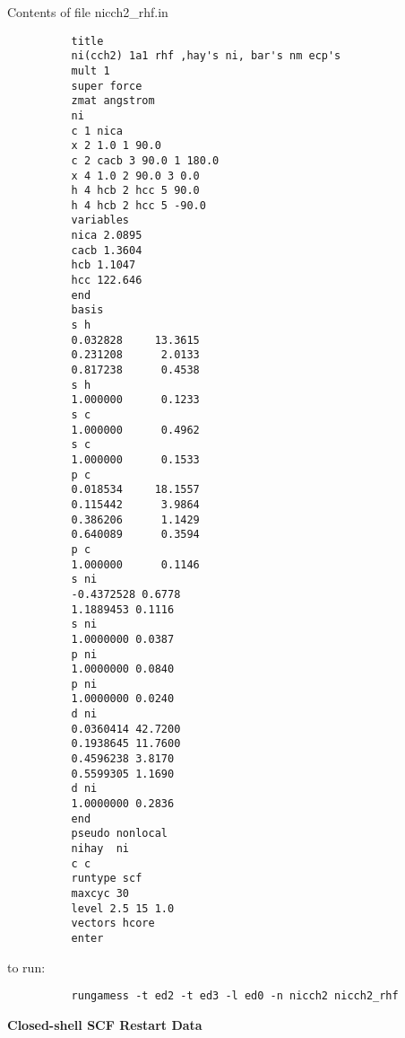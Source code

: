 \documentclass[11pt,fleqn]{article}
\begin{document}
Contents of file nicch2\_rhf.in
{
\footnotesize
\begin{verbatim}
          title
          ni(cch2) 1a1 rhf ,hay's ni, bar's nm ecp's
          mult 1
          super force
          zmat angstrom
          ni
          c 1 nica
          x 2 1.0 1 90.0
          c 2 cacb 3 90.0 1 180.0
          x 4 1.0 2 90.0 3 0.0
          h 4 hcb 2 hcc 5 90.0
          h 4 hcb 2 hcc 5 -90.0
          variables
          nica 2.0895
          cacb 1.3604
          hcb 1.1047
          hcc 122.646
          end
          basis
          s h
          0.032828     13.3615
          0.231208      2.0133
          0.817238      0.4538
          s h
          1.000000      0.1233
          s c
          1.000000      0.4962
          s c
          1.000000      0.1533
          p c
          0.018534     18.1557
          0.115442      3.9864
          0.386206      1.1429
          0.640089      0.3594
          p c
          1.000000      0.1146
          s ni
          -0.4372528 0.6778
          1.1889453 0.1116
          s ni
          1.0000000 0.0387
          p ni
          1.0000000 0.0840
          p ni
          1.0000000 0.0240
          d ni
          0.0360414 42.7200
          0.1938645 11.7600
          0.4596238 3.8170
          0.5599305 1.1690
          d ni
          1.0000000 0.2836
          end
          pseudo nonlocal
          nihay  ni
          c c
          runtype scf
          maxcyc 30
          level 2.5 15 1.0
          vectors hcore
          enter
\end{verbatim}
}
to run:
{
\footnotesize
\begin{verbatim}
          rungamess -t ed2 -t ed3 -l ed0 -n nicch2 nicch2_rhf
\end{verbatim}
}
{\bf Closed-shell SCF Restart Data}\\
\end{document}
